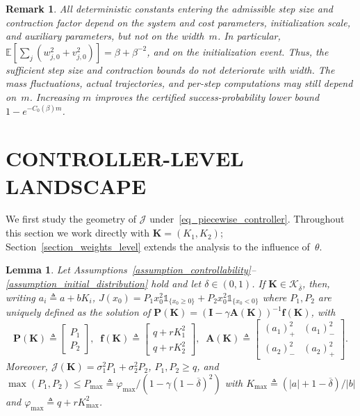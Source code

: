\documentclass[letterpaper, 10 pt, conference]{ieeeconf}
\newcommand{\E}{\mathbb{E}}
\newcommand{\mbf}{\mathbf{f}}
\newcommand{\bA}{\mathbf{A}}
\newcommand{\bI}{\mathbf{I}}
\newcommand{\bK}{\mathbf{K}}
\newcommand{\bP}{\mathbf{P}}
\newcommand{\cJ}{\mathcal{J}}
\newcommand{\cK}{\mathcal{K}}
\newcommand{\ind}[1]{\mathds{1}_{#1}}
\newtheorem{remark}{Remark}
\newtheorem{lemma}{Lemma}
\newcommand{\Sect}{Section}
\begin{document}
\begin{remark}\label{remark_width_free}
All deterministic constants entering the admissible step size and contraction factor depend on the system and cost parameters, initialization scale, and auxiliary parameters, but not on the width~$m$. In particular,
$\E[\sum_j(w_{j,0}^2+v_{j,0}^2)]=\beta+\beta^{-2}$, and on the initialization event. Thus, the sufficient step size and contraction bounds do not deteriorate with width. The mass fluctuations, actual trajectories, and per-step computations may still depend on~$m$. Increasing $m$ improves the certified success-probability lower bound $1-e^{-C_0(\beta)m}$.
\end{remark}

\section{CONTROLLER-LEVEL LANDSCAPE}
\label{section_policy_level}

We first study the geometry of $\cJ$ under~\eqref{eq_piecewise_controller}. Throughout this section we work directly with $\bK = (K_{1}, K_{2})$; \Sect~\ref{section_weights_level} extends the analysis to the influence of~$\theta$.
 
\begin{lemma} \label{lemma_state_value_function}
   Let Assumptions~\ref{assumption_controllability}--\ref{assumption_initial_distribution} hold and let $\delta \in (0, 1)$. If $\bK\in \cK_{\overline{\delta}}$, then, writing $a_i\triangleq a+bK_i$, $J(x_{0}) = P_{1} x_{0}^2 \ind{\{x_0 \ge 0\}} + P_{2} x_{0}^2 \ind{\{x_0 < 0\}}$ where $P_{1}, P_{2}$ are uniquely defined as the solution of $\bP(\bK) = (\bI - \gamma \bA(\bK) )^{-1} \mbf(\bK)$, with
    {\small
    \begin{equation}
        \bP(\bK) {\triangleq}
        \begin{bmatrix}
            P_{1} \\
            P_{2}
        \end{bmatrix},\;\;
        \mbf(\bK) {\triangleq}
        \begin{bmatrix}
            q + rK_{1}^2 \\
            q + rK_{2}^2
        \end{bmatrix},\;\;
        \bA(\bK) {\triangleq}
        \begin{bmatrix}
            (a_{1})_{+}^2 & (a_{1})_{-}^2 \\
            (a_{2})_{-}^2 & (a_{2})_{+}^2
        \end{bmatrix}.
    \end{equation}
    }Moreover, $\cJ(\bK) = \sigma_{1}^{2} P_{1} + \sigma_{2}^{2} P_{2}$, $P_{1}, P_{2} \ge q$, and $\max(P_{1}, P_{2}) \le P_{\max} \triangleq \varphi_{\max} / (1 - \gamma(1 - \overline{\delta})^2)$ with $K_{\max} \triangleq (|a| + 1 - \overline{\delta}) / |b|$ and $\varphi_{\max} \triangleq q + rK_{\max}^2$.
\end{lemma}
 
\end{document}
